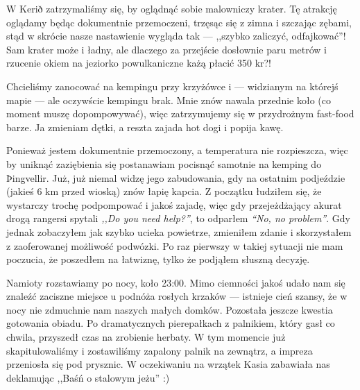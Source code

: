 
W Kerið zatrzymaliśmy się, by oglądnąć sobie malowniczy krater. Tę atrakcję oglądamy będąc dokumentnie przemoczeni, trzęsąc się z zimna i szczając zębami, stąd w skrócie nasze nastawienie wygląda tak --- ,,szybko zaliczyć, odfajkować''! Sam krater może i ładny, ale dlaczego za przejście dosłownie paru metrów i rzucenie okiem na jeziorko powulkaniczne każą płacić 350 kr?!

Chcieliśmy zanocować na kempingu przy krzyżówce  i  --- widzianym na którejś mapie --- ale oczywście kempingu brak. Mnie znów nawala przednie koło (co moment muszę dopompowywać), więc zatrzymujemy się w przydrożnym fast-food barze. Ja zmieniam dętki, a reszta zajada hot dogi i popija kawę.


Ponieważ jestem dokumentnie przemoczony, a temperatura nie rozpieszcza, więc by uniknąć zaziębienia się postanawiam pocisnąć samotnie na kemping do Þingvellir. Już, już niemal widzę jego zabudowania, gdy na ostatnim podjeździe (jakieś 6 km przed wioską) znów łapię kapcia. Z początku łudziłem się, że wystarczy trochę podpompować i jakoś zajadę, więc gdy przejeżdżający akurat drogą rangersi spytali \emph{,,Do you need help?''}, to odparłem \emph{“No, no problem”}. Gdy jednak zobaczyłem jak szybko ucieka powietrze, zmieniłem zdanie i skorzystałem z zaoferowanej możliwość podwózki. Po raz pierwszy w takiej sytuacji nie mam poczucia, że poszedłem na łatwiznę, tylko że podjąłem słuszną decyzję.

Namioty rozstawiamy po nocy, koło 23:00. Mimo ciemności jakoś udało nam się znaleźć zaciszne miejsce u podnóża rosłych krzaków --- istnieje cień szansy, że w nocy nie zdmuchnie nam naszych małych domków. Pozostała jeszcze kwestia gotowania obiadu. Po dramatycznych pierepałkach z palnikiem, który gasł co chwila, przyszedł czas na zrobienie herbaty. W tym momencie już skapitulowaliśmy i zostawiliśmy zapalony palnik na zewnątrz, a impreza przeniosła się pod prysznic. W oczekiwaniu na wrzątek Kasia zabawiała nas deklamując ,,Baśń o stalowym jeżu'' :)

